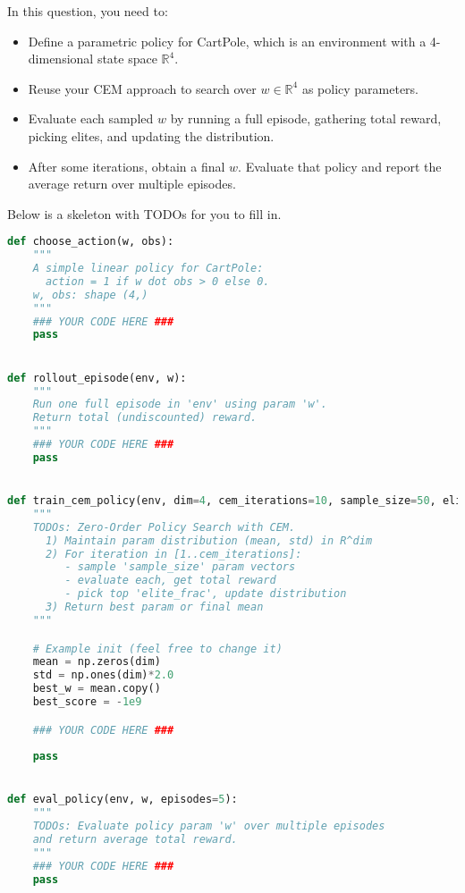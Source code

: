 \documentclass{article}
\begin{document}
\noindent In this question, you need to:

\begin{itemize}
    \item Define a parametric policy for CartPole, which is an environment with a 4-dimensional state space $\mathbb{R}^4$. 
    \item Reuse your CEM approach to search over $w \in \mathbb{R}^4$ as policy parameters.
    \item Evaluate each sampled $w$ by running a full episode, gathering total reward, picking elites, and updating the distribution.
    \item After some iterations, obtain a final $w$. Evaluate that policy and report the average return over multiple episodes.
\end{itemize}

\noindent Below is a skeleton with TODOs for you to fill in.


\begin{solution}
\begin{lstlisting}[language=Python]
def choose_action(w, obs):
    """
    A simple linear policy for CartPole: 
      action = 1 if w dot obs > 0 else 0.
    w, obs: shape (4,)
    """
    ### YOUR CODE HERE ###
    pass


def rollout_episode(env, w):
    """
    Run one full episode in 'env' using param 'w'.
    Return total (undiscounted) reward.
    """
    ### YOUR CODE HERE ###
    pass


def train_cem_policy(env, dim=4, cem_iterations=10, sample_size=50, elite_frac=0.2):
    """
    TODOs: Zero-Order Policy Search with CEM.
      1) Maintain param distribution (mean, std) in R^dim
      2) For iteration in [1..cem_iterations]:
         - sample 'sample_size' param vectors
         - evaluate each, get total reward
         - pick top 'elite_frac', update distribution
      3) Return best param or final mean
    """

    # Example init (feel free to change it)
    mean = np.zeros(dim)  
    std = np.ones(dim)*2.0 
    best_w = mean.copy()
    best_score = -1e9

    ### YOUR CODE HERE ###
    
    pass 


def eval_policy(env, w, episodes=5):
    """
    TODOs: Evaluate policy param 'w' over multiple episodes 
    and return average total reward.
    """
    ### YOUR CODE HERE ###
    pass


\end{lstlisting}
\end{solution}
\end{document}
